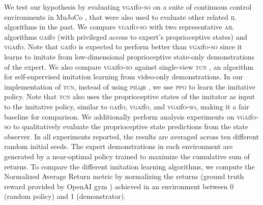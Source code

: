 \documentclass[letterpaper, 10 pt, conference]{ieeeconf}  %
\newcommand{\gaifo}{\textsc{gai}f\textsc{o}}
\newcommand{\ifo}{\textsc{i}f\textsc{o}}
\newcommand{\vgaifo}{\textsc{vgai}f\textsc{o}}
\newcommand{\vgaifoso}{\textsc{vgai}f\textsc{o}-\textsc{so}}
\newcommand{\tcn}{\textsc{tcn}}
\newcommand{\ail}{\textsc{ail}}
\newcommand{\ppo}{\textsc{ppo}}
\newcommand{\pilqr}{\textsc{pilqr}}
\newcommand{\il}{\textsc{il}}
\begin{document}
We test our hypothesis by evaluating \vgaifoso{} on a suite of continuous control environments in MuJoCo \cite{mujoco, openai}, that were also used to evaluate other related \il{} algorithms \cite{gail, gaifo, gaifo_proprio} in the past. We compare \vgaifoso{} with two representative \ail{} algorithms \gaifo{} (with privileged access to expert's proprioceptive states) and \vgaifo{}. Note that \gaifo{} is expected to perform better than \vgaifoso{} since it learns to imitate from low-dimensional proprioceptive state-only demonstrations of the expert. We also compare \vgaifoso{} against single-view \tcn{} \cite{tcn}, an algorithm for self-supervised imitation learning from video-only demonstrations. 
In our implementation of \tcn{}, instead of using \pilqr{} \cite{pilqr}, we use \ppo{} \cite{ppo, ppoilya} to learn the imitative policy. Note that \tcn{} also uses the proprioceptive states of the imitator as input to the imitative policy, similar to \gaifo{}, \vgaifo{}, and \vgaifoso{}, making it a fair baseline for comparison. We additionally perform analysis experiments on \vgaifoso{} to qualitatively evaluate the proprioceptive state predictions from the state observer. In all experiments reported, the results are averaged across ten different random initial seeds. The expert demonstrations in each environment are generated by a near-optimal policy trained to maximize the cumulative sum of returns. To compare the different imitation learning algorithms, we compute the Normalized Average Return metric by normalizing the returns (ground truth reward provided by OpenAI gym \cite{openai}) achieved in an environment between 0 (random policy) and 1 (demonstrator). 


\end{document}
